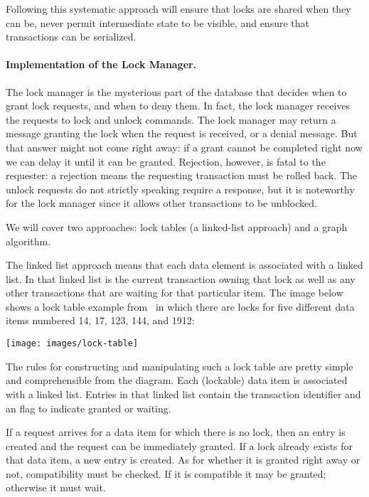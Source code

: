 Following this systematic approach will ensure that locks are shared when they can be, never permit intermediate state to be visible, and ensure that transactions can be serialized.

\paragraph{Implementation of the Lock Manager.} The lock manager is the mysterious part of the database that decides when to grant lock requests, and when to deny them. In fact, the lock manager receives the requests to lock and unlock commands. The lock manager may return a message granting the lock when the request is received, or a denial message. But that answer might not come right away: if a grant cannot be completed right now we can delay it until it can be granted. Rejection, however, is fatal to the requester: a rejection means the requesting transaction must be rolled back. The unlock requests do not strictly speaking require a response, but it is noteworthy for the lock manager since it allows other transactions to be unblocked.

We will cover two approaches: lock tables (a linked-list approach) and a graph algorithm.

The linked list approach means that each data element is associated with a linked list. In that linked list is the current transaction owning that lock as well as any other transactions that are waiting for that particular item. The image below shows a lock table example from~\cite{dsc} in which there are locks for five different data items numbered 14, 17, 123, 144, and 1912:

\begin{center}
	\texttt{[image: images/lock-table]}
\end{center}

The rules for constructing and manipulating such a lock table are pretty simple and comprehensible from the diagram. Each (lockable) data item is associated with a linked list. Entries in that linked list contain the transaction identifier and an flag to indicate granted or waiting.

If a request arrives for a data item for which there is no lock, then an entry is created and the request can be immediately granted. If a lock already exists for that data item, a new entry is created. As for whether it is granted right away or not, compatibility must be checked. If it is compatible it may be granted; otherwise it must wait.

